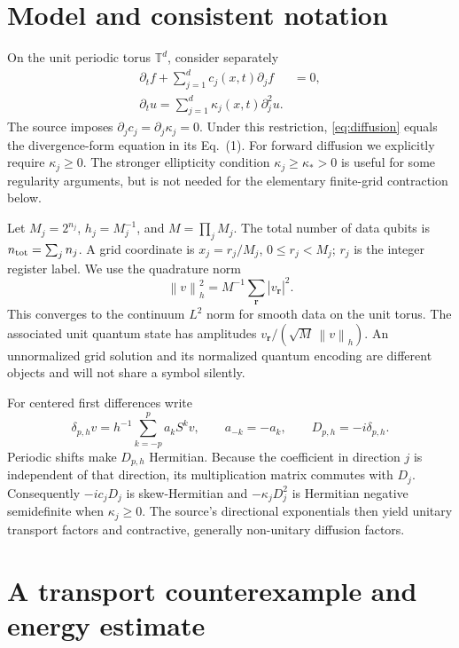 \documentclass[11pt]{article}
\newcommand{\norm}[1]{\left\lVert #1\right\rVert}
\newcommand{\T}{\mathbb T}
\begin{document}
\section{Model and consistent notation}
On the unit periodic torus $\T^d$, consider separately
\begin{align}
\partial_t f+\sum_{j=1}^d c_j(x,t)\partial_j f&=0,
\label{eq:transport}\\
\partial_t u=\sum_{j=1}^d \kappa_j(x,t)\partial_j^2u .
\label{eq:diffusion}
\end{align}
The source imposes $\partial_jc_j=\partial_j\kappa_j=0$.
Under this restriction, \eqref{eq:diffusion} equals the divergence-form
equation in its Eq.~(1). For forward diffusion we explicitly require
$\kappa_j\geq0$. The stronger ellipticity condition
$\kappa_j\geq\kappa_*>0$ is useful for some regularity arguments, but is
not needed for the elementary finite-grid contraction below.

Let $M_j=2^{n_j}$, $h_j=M_j^{-1}$, and $M=\prod_jM_j$.
The total number of data qubits is $n_{\rm tot}=\sum_j n_j$.
A grid coordinate is $x_j=r_j/M_j$, $0\leq r_j<M_j$;
$r_j$ is the integer register label. We use the quadrature norm
\[
 \norm{v}_h^2=M^{-1}\sum_{\boldsymbol r}|v_{\boldsymbol r}|^2.
\]
This converges to the continuum $L^2$ norm for smooth data on the unit torus.
The associated unit quantum state has amplitudes
$v_{\boldsymbol r}/(\sqrt M\,\norm{v}_h)$.
An unnormalized grid solution and its normalized quantum encoding are
different objects and will not share a symbol silently.

For centered first differences write
\[
 \delta_{p,h}v=h^{-1}\sum_{k=-p}^p a_k S^k v,\qquad
 a_{-k}=-a_k,\qquad D_{p,h}=-i\delta_{p,h}.
\]
Periodic shifts make $D_{p,h}$ Hermitian. Because the coefficient in
direction $j$ is independent of that direction, its multiplication matrix
commutes with $D_j$. Consequently $-ic_jD_j$ is skew-Hermitian and
$-\kappa_jD_j^2$ is Hermitian negative semidefinite when $\kappa_j\geq0$.
The source's directional exponentials then yield unitary transport
factors and contractive, generally non-unitary diffusion factors.

\section{A transport counterexample and energy estimate}
\end{document}

